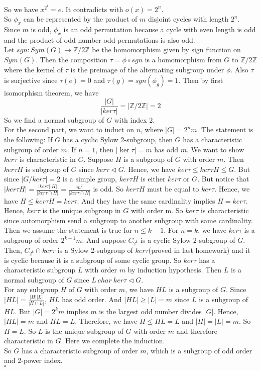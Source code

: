 \documentclass[12pt]{amsart}
\newcommand{\Z}{\mathbb{Z}}
\newcommand{\normal}{\triangleleft}
\begin{document}
So we have $x^{2^i}=e$. It contradicts with $o(x)=2^n$.\\
So $\phi_x$ can be represented by the product of $m$ disjoint cycles with length $2^n$. Since $m$ is odd, $\phi_x$ is an odd permutation because a cycle with even length is odd and the product of odd number odd permutations is also odd.\\
 Let $sgn: Sym(G)\to \Z/2\Z$ be the homomorphism given by sign function on $Sym(G)$. Then the composition $\tau=\phi\circ sgn$ is a homomorphism from $G$ to $\Z/2\Z$ where the kernel of $\tau$ is the preimage of the alternating subgroup under $\phi$. Also $\tau$ is surjective since $\tau(e)=0$ and $\tau(g)=sgn(\phi_g)=1$. Then by first isomorphism theorem, we have 
 \[\frac{|G|}{|ker\tau|}=|\Z/2\Z|=2\]
 So we find a normal subgroup of $G$ with index 2.\\
 For the second part, we want to induct on $n$, where $|G|=2^nm$. The statement is the following: If $G$ has a cyclic Sylow 2-subgroup, then $G$ has a characteristic subgroup of order $m$.
 If $n=1$, then $|\ker \tau|=m$ has odd $m$. We want to show $ker\tau$ is characteristic in $G$. Suppose $H$ is a subgroup of $G$ with order $m$. Then $ker\tau H$ is subgroup of $G$ since $ker\tau \normal G$. Hence, we have $ker\tau \leq ker\tau H\leq G$. But since $|G/ker\tau|=2$ is a simple group, $ker\tau H$ is either $ker\tau $ or $G$. But notice that $|ker\tau H|=\frac{|ker\tau ||H|}{|ker\tau \cap H|}=\frac{m^2}{|ker\tau \cap H|}$ is odd. So $ker\tau H$ must be equal to $ker\tau$. Hence, we have $H\leq  ker\tau H=ker\tau$. And they have the same cardinality implies $H=ker\tau$. Hence, $ker\tau$ is the unique subgroup in $G$ with order m. So $ker\tau$ is characteristic since automorphism send a subgroup to another subgroup with same cardinality.\\
 Then we assume the statement is true for $n\leq k-1$. For $n=k$, we have $ker\tau$ is a subgroup of order $2^{k-1}m$. And suppose $C_{2^k}$ is a cyclic Sylow 2-subgroup of $G$. Then, $C_{2^k}\cap ker\tau$ is a Sylow 2-subgroup of $ker\tau$(proved in last homework) and it is cyclic because it is a subgroup of some cyclic group. So $ker\tau$ has a characteristic subgroup $L$ with order $m$ by induction hypothesis. Then $L$ is a normal subgroup of $G$ since $L\ char\ ker\tau \normal G$.\\
 For any subgroup $H$ of $G$ with order $m$, we have $HL$ is a subgroup of $G$. Since $|HL|=\frac{|H||L|}{|H\cap L|}$, $HL$ has odd order. And $|HL|\geq |L|=m$ since $L$ is a subgroup of $HL$. But $|G|=2^km$ implies $m$ is the largest odd number divides $|G|$. Hence, $|HL|=m$ and $HL=L$. Therefore, we have $H\leq HL=L$ and $|H|=|L|=m$. So $H=L$. So $L$ is the unique subgroup of $G$ with order $m$ and therefore characteristic in $G$. Here we complete the induction.\\
 So $G$ has a characteristic subgroup of order $m$, which is a subgroup of odd order and 2-power index.
 \\\phantom{qed}\hfill$\square$\\
\end{document}
